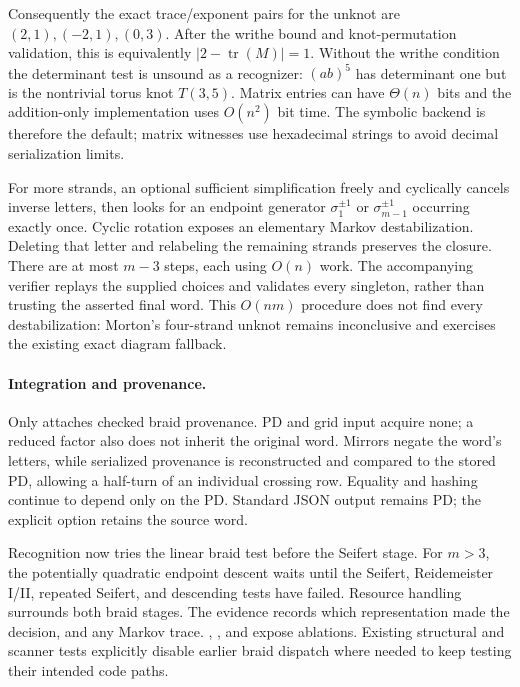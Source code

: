 Consequently the exact trace/exponent pairs for the unknot are
$(2,1),(-2,1),(0,3)$. After the writhe bound and knot-permutation
validation, this is equivalently $|2-\operatorname{tr}(M)|=1$.
Without the writhe condition the determinant test is unsound as a
recognizer: $(ab)^5$ has determinant one but is the nontrivial torus
knot $T(3,5)$. Matrix entries can have $\Theta(n)$ bits and the
addition-only implementation uses $O(n^2)$ bit time. The symbolic
backend is therefore the default; matrix witnesses use hexadecimal
strings to avoid decimal serialization limits.

For more strands, an optional sufficient simplification freely and
cyclically cancels inverse letters, then looks for an endpoint generator
$\sigma_1^{\pm1}$ or $\sigma_{m-1}^{\pm1}$ occurring exactly once.
Cyclic rotation exposes an elementary Markov destabilization. Deleting
that letter and relabeling the remaining strands preserves the closure.
There are at most $m-3$ steps, each using $O(n)$ work. The accompanying
verifier replays the supplied choices and validates every singleton,
rather than trusting the asserted final word. This $O(nm)$ procedure
does not find every destabilization: Morton's four-strand unknot remains
inconclusive and exercises the existing exact diagram fallback.

\paragraph{Integration and provenance.}
Only  attaches checked braid provenance.
PD and grid input acquire none; a reduced factor also does not inherit
the original word. Mirrors negate the word's letters, while serialized
provenance is reconstructed and compared to the stored PD, allowing a
half-turn of an individual crossing row. Equality and hashing continue
to depend only on the PD. Standard JSON output remains PD; the explicit
 option retains the source word.

Recognition now tries the linear braid test before the Seifert stage.
For $m>3$, the potentially quadratic endpoint descent waits until the
Seifert, Reidemeister I/II, repeated Seifert, and descending tests have
failed. Resource handling surrounds both braid stages. The evidence
records which representation made the decision, and any Markov trace.
, , and
 expose ablations. Existing structural and
scanner tests explicitly disable earlier braid dispatch where needed
to keep testing their intended code paths.

